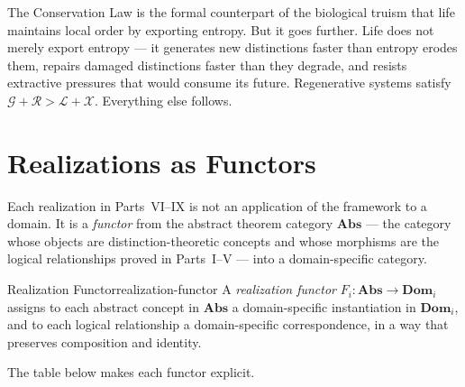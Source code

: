 \documentclass[12pt,twoside,openright]{book}
\begin{document}
\noindent
The Conservation Law is the formal counterpart of the
biological truism that life maintains local order by
exporting entropy. But it goes further. Life does not
merely export entropy — it generates new distinctions
faster than entropy erodes them, repairs damaged
distinctions faster than they degrade, and resists
extractive pressures that would consume its future.
Regenerative systems satisfy $\mathcal{G} + \mathcal{R}
> \mathcal{L} + \mathcal{X}$. Everything else follows.

\section{Realizations as Functors}
\label{sec:ch30-functors}

Each realization in Parts~VI--IX is not an application
of the framework to a domain. It is a \emph{functor}
from the abstract theorem category $\mathbf{Abs}$ —
the category whose objects are distinction-theoretic
concepts and whose morphisms are the logical relationships
proved in Parts~I--V — into a domain-specific category.

\begin{definition}{Realization Functor}{realization-functor}
  A \emph{realization functor}
  $F_i : \mathbf{Abs} \to \mathbf{Dom}_i$
  assigns to each abstract concept in $\mathbf{Abs}$
  a domain-specific instantiation in $\mathbf{Dom}_i$,
  and to each logical relationship a domain-specific
  correspondence, in a way that preserves composition
  and identity.
\end{definition}

The table below makes each functor explicit.
\end{document}
